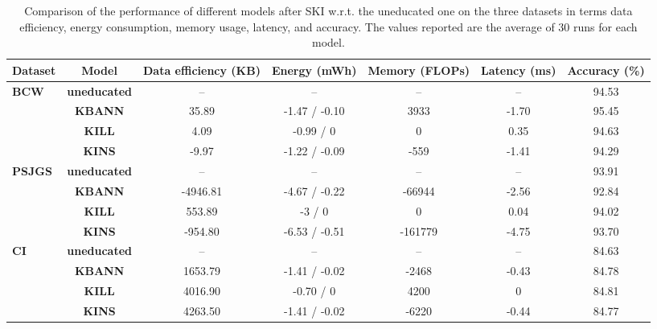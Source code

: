 \begin{table}
    \centering
    \begin{adjustbox}{width=\linewidth,center}
        \begin{tabular}{l|c|c|c|c|c|c}
            \toprule
            \textbf{Dataset} & \textbf{Model} & \textbf{Data efficiency (KB)} & \textbf{Energy (mWh)} & \textbf{Memory (FLOPs)} & \textbf{Latency (ms)} & \textbf{Accuracy (\%)}\\

            \midrule
            \multirow{4}{*}{\textbf{BCW}} & \textbf{uneducated} & -- & -- & -- & -- & 94.53\\
            \cmidrule{2-7}
            & {\textbf{KBANN}} & {35.89} & -1.47 / -0.10 & {3933} & {-1.70} & {95.45}\\
            \cline{2-7}
            & {\textbf{KILL}} &  {4.09} & -0.99 / 0 & {0} & {0.35} & {94.63}\\
            \cline{2-7}
            & {\textbf{KINS}} &  {-9.97} & -1.22 / -0.09 & {-559} & {-1.41} & {94.29}\\
            \midrule

            \multirow{4}{*}{\textbf{PSJGS}} & \textbf{uneducated} & -- & -- & -- & -- & 93.91\\
            \cline{2-7}
            & {\textbf{KBANN}} & {-4946.81} & -4.67 / -0.22 & {-66944} & {-2.56} & {92.84}\\
            \cline{2-7}
            & {\textbf{KILL}} &  {553.89} & -3 / 0 & {0} & {0.04} & {94.02}\\
            \cline{2-7}
            & {\textbf{KINS}} &  {-954.80} & -6.53 / -0.51 & {-161779} & {-4.75} & {93.70}\\
            \midrule

            \multirow{4}{*}{\textbf{CI}} & \textbf{uneducated} & -- & -- & -- & -- & 84.63\\
            \cline{2-7}
            & {\textbf{KBANN}} & {1653.79} & -1.41 / -0.02 & {-2468} & {-0.43} & {84.78}\\
            \cline{2-7}
            & {\textbf{KILL}} & {4016.90} & -0.70  / 0 & {4200} & {0} & {84.81}\\
            \cline{2-7}
            & {\textbf{KINS}} & {4263.50} & -1.41 / -0.02 & {-6220} & {-0.44} & {84.77}\\
            \bottomrule
        \end{tabular}
    \end{adjustbox}
    \caption[QoS results for different \gls{SKI} methods]{
        Comparison of the performance of different models after \gls{SKI} w.r.t. the uneducated one on the three datasets in terms data efficiency, energy consumption, memory usage, latency, and accuracy.
        The values reported are the average of 30 runs for each model.
    }
    \label{tab:qos-results}
\end{table}
